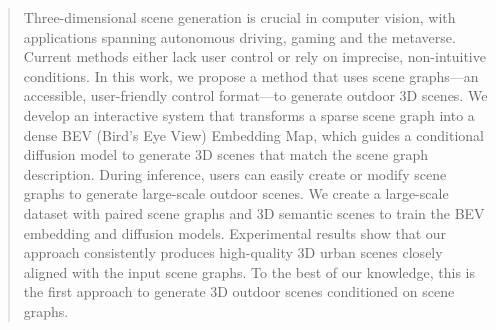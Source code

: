 \begin{abstract}
Three-dimensional scene generation is crucial in computer vision, with applications spanning autonomous driving, gaming and the metaverse. Current methods either lack user control or rely on imprecise, non-intuitive conditions. In this work, we propose a method that uses scene graphs—an accessible, user-friendly control format—to generate outdoor 3D scenes. We develop an interactive system that transforms a sparse scene graph into a dense BEV (Bird's Eye View) Embedding Map, which guides a conditional diffusion model to generate 3D scenes that match the scene graph description. During inference, users can easily create or modify scene graphs to generate large-scale outdoor scenes. We create a large-scale dataset with paired scene graphs and 3D semantic scenes to train the BEV embedding and diffusion models. Experimental results show that our approach consistently produces high-quality 3D urban scenes closely aligned with the input scene graphs. To the best of our knowledge, this is the first approach to generate 3D outdoor scenes conditioned on scene graphs. 
\end{abstract}
